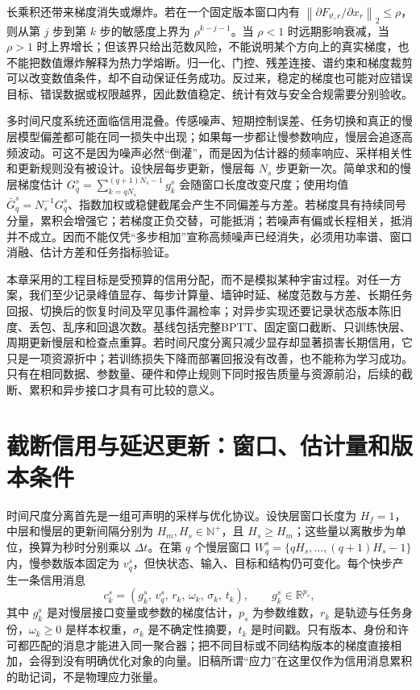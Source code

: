 长乘积还带来梯度消失或爆炸。若在一个固定版本窗口内有 $\left\lVert \partial F_{\vartheta,r}/\partial x_r\right\rVert_2\leq\rho$，则从第 $j$ 步到第 $k$ 步的敏感度上界为 $\rho^{k-j-1}$。当 $\rho<1$ 时远期影响衰减，当 $\rho>1$ 时上界增长；但该界只给出范数风险，不能说明某个方向上的真实梯度，也不能把数值爆炸解释为热力学熔断。归一化、门控、残差连接、谱约束和梯度裁剪可以改变数值条件，却不自动保证任务成功。反过来，稳定的梯度也可能对应错误目标、错误数据或权限越界，因此数值稳定、统计有效与安全合规需要分别验收。

多时间尺度系统还面临信用混叠。传感噪声、短期控制误差、任务切换和真正的慢层模型偏差都可能在同一损失中出现；如果每一步都让慢参数响应，慢层会追逐高频波动。可这不是因为噪声必然“倒灌”，而是因为估计器的频率响应、采样相关性和更新规则没有被设计。设快层每步更新，慢层每 $N_s$ 步更新一次。简单求和的慢层梯度估计 $G_q^s=\sum_{k=qN_s}^{(q+1)N_s-1}g_k^s$ 会随窗口长度改变尺度；使用均值 $\bar G_q^s=N_s^{-1}G_q^s$、指数加权或稳健截尾会产生不同偏差与方差。若梯度具有持续同号分量，累积会增强它；若梯度正负交替，可能抵消；若噪声有偏或长程相关，抵消并不成立。因而不能仅凭“多步相加”宣称高频噪声已经消失，必须用功率谱、窗口消融、估计方差和任务指标验证。

本章采用的工程目标是受预算的信用分配，而不是模拟某种宇宙过程。对任一方案，我们至少记录峰值显存、每步计算量、墙钟时延、梯度范数与方差、长期任务回报、切换后的恢复时间及罕见事件漏检率；对异步实现还要记录状态版本陈旧度、丢包、乱序和回退次数。基线包括完整BPTT、固定窗口截断、只训练快层、周期更新慢层和检查点重算。若时间尺度分离只减少显存却显著损害长期信用，它只是一项资源折中；若训练损失下降而部署回报没有改善，也不能称为学习成功。只有在相同数据、参数量、硬件和停止规则下同时报告质量与资源前沿，后续的截断、累积和异步接口才具有可比较的意义。

\section{截断信用与延迟更新：窗口、估计量和版本条件}
\label{sec:app_math_reconstruction}

时间尺度分离首先是一组可声明的采样与优化协议。设快层窗口长度为 $H_f=1$，中层和慢层的更新间隔分别为 $H_m,H_s\in\mathbb{N}^{+}$，且 $H_s\geq H_m$；这些量以离散步为单位，换算为秒时分别乘以 $\Delta t$。在第 $q$ 个慢层窗口 $W_q^s=\{qH_s,\ldots,(q+1)H_s-1\}$ 内，慢参数版本固定为 $v_q^s$，但快状态、输入、目标和结构仍可变化。每个快步产生一条信用消息
\begin{equation}
 c_k^s=(g_k^s,\,v_q^s,\,r_k,\,\omega_k,\,\sigma_k,\,t_k),
 \qquad g_k^s\in\mathbb{R}^{p_s},
\end{equation}
其中 $g_k^s$ 是对慢层接口变量或参数的梯度估计，$p_s$ 为参数维数，$r_k$ 是轨迹与任务身份，$\omega_k\geq0$ 是样本权重，$\sigma_k$ 是不确定性摘要，$t_k$ 是时间戳。只有版本、身份和许可都匹配的消息才能进入同一聚合器；把不同目标或不同结构版本的梯度直接相加，会得到没有明确优化对象的向量。旧稿所谓“应力”在这里仅作为信用消息累积的助记词，不是物理应力张量。


